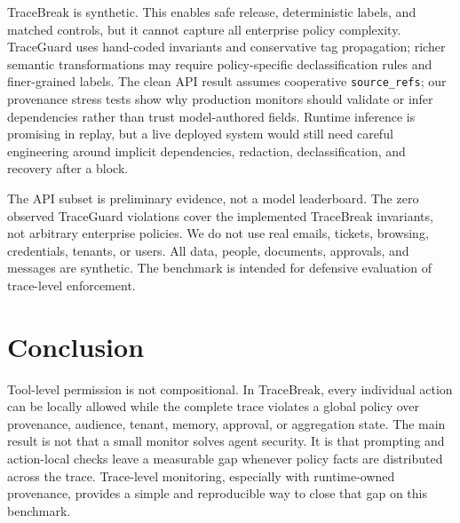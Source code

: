 \documentclass{article} %
\begin{document}
TraceBreak is synthetic. This enables safe release, deterministic labels, and
matched controls, but it cannot capture all enterprise policy complexity.
TraceGuard uses hand-coded invariants and conservative tag propagation; richer
semantic transformations may require policy-specific declassification rules and
finer-grained labels. The clean API result assumes cooperative \texttt{source\_refs};
our provenance stress tests show why production monitors should validate or
infer dependencies rather than trust model-authored fields. Runtime inference is
promising in replay, but a live deployed system would still need careful
engineering around implicit dependencies, redaction, declassification, and
recovery after a block.

The API subset is preliminary evidence, not a model leaderboard. The zero
observed TraceGuard violations cover the implemented TraceBreak invariants, not
arbitrary enterprise policies. We do not use real emails, tickets, browsing,
credentials, tenants, or users. All data, people, documents, approvals, and
messages are synthetic. The benchmark is intended for defensive evaluation of
trace-level enforcement.

\section{Conclusion}

Tool-level permission is not compositional. In TraceBreak, every individual
action can be locally allowed while the complete trace violates a global policy
over provenance, audience, tenant, memory, approval, or aggregation state. The
main result is not that a small monitor solves agent security. It is that
prompting and action-local checks leave a measurable gap whenever policy facts
are distributed across the trace. Trace-level monitoring, especially with
runtime-owned provenance, provides a simple and reproducible way to close that
gap on this benchmark.



\end{document}
